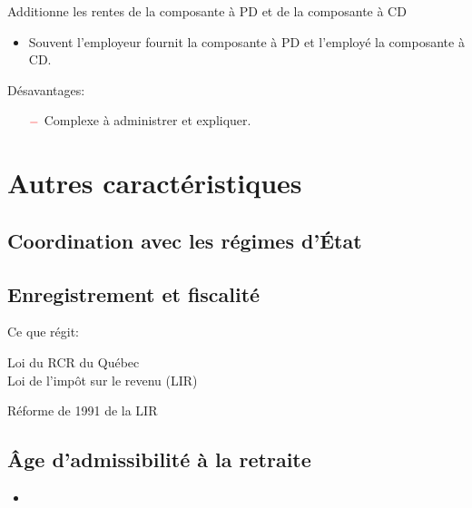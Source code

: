 \documentclass[10pt, french]{article}
\begin{document}
\begin{multicols*}{3}
\begin{definitionNOHFILL}[Combiné]
Additionne les rentes de la composante à PD et de la composante à CD

\begin{itemize}[leftmargin = *]
	\item	Souvent l'employeur fournit la composante à PD et l'employé la composante à CD.
\end{itemize}

Désavantages:
\begin{itemize}
	\item[$\color{red}-$]	Complexe à administrer et expliquer.
\end{itemize}
\end{definitionNOHFILL}

\columnbreak

\section*{Autres caractéristiques}

\subsection*{Coordination avec les régimes d'État}

\subsection*{Enregistrement et fiscalité}

Ce que régit:
\begin{description}
	\item[Loi du RCR du Québec]
	\item[Loi de l'impôt sur le revenu (LIR)]
\end{description}

Réforme de 1991 de la LIR

\subsection*{Âge d'admissibilité à la retraite}
\begin{itemize}[leftmargin = *]
	\item	
\end{itemize}


\end{multicols*}
\end{document}
